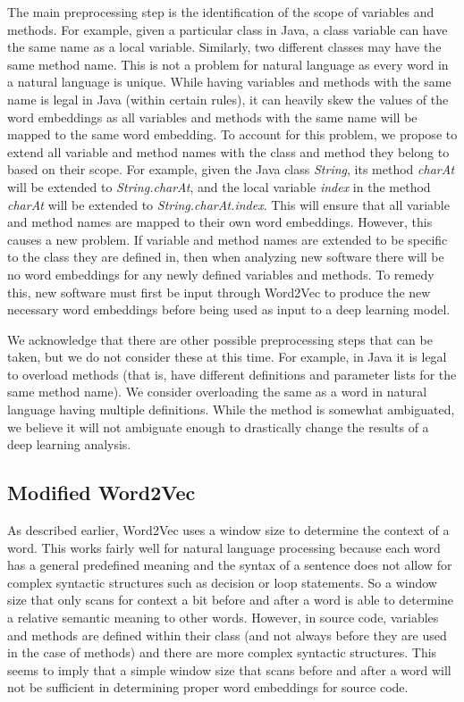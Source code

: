 The main preprocessing step is the identification of the scope of variables and methods. For example, given a particular class in Java, a class variable can have the same name as a local variable. Similarly, two different classes may have the same method name. This is not a problem for natural language as every word in a natural language is unique. While having variables and methods with the same name is legal in Java (within certain rules), it can heavily skew the values of the word embeddings as all variables and methods with the same name will be mapped to the same word embedding. To account for this problem, we propose to extend all variable and method names with the class and method they belong to based on their scope. For example, given the Java class \textit{String}, its method \textit{charAt} will be extended to \textit{String.charAt}, and the local variable \textit{index} in the method \textit{charAt} will be extended to \textit{String.charAt.index}. This will ensure that all variable and method names are mapped to their own word embeddings. However, this causes a new problem. If variable and method names are extended to be specific to the class they are defined in, then when analyzing new software there will be no word embeddings for any newly defined variables and methods. To remedy this, new software must first be input through Word2Vec to produce the new necessary word embeddings before being used as input to a deep learning model.

We acknowledge that there are other possible preprocessing steps that can be taken, but we do not consider these at this time. For example, in Java it is legal to overload methods (that is, have different definitions and parameter lists for the same method name). We consider overloading the same as a word in natural language having multiple definitions. While the method is somewhat ambiguated, we believe it will not ambiguate enough to drastically change the results of a deep learning analysis.

\subsection{Modified Word2Vec}

As described earlier, Word2Vec uses a window size to determine the context of a word. This works fairly well for natural language processing because each word has a general predefined meaning and the syntax of a sentence does not allow for complex syntactic structures such as decision or loop statements. So a window size that only scans for context a bit before and after a word is able to determine a relative semantic meaning to other words. However, in source code, variables and methods are defined within their class (and not always before they are used in the case of methods) and there are more complex syntactic structures. This seems to imply that a simple window size that scans before and after a word will not be sufficient in determining proper word embeddings for source code.

